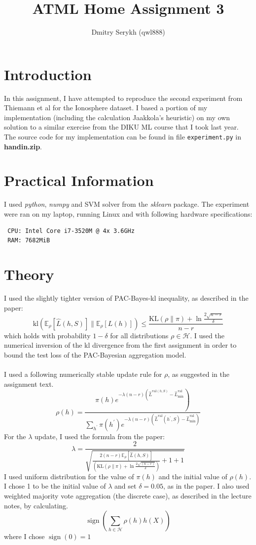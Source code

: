 \documentclass[a4paper]{article}
\title{\vspace{-5cm}ATML Home Assignment 3}
\author{Dmitry Serykh (qwl888)}
\begin{document}
\maketitle
\section{Introduction}
In this assignment, I have attempted to reproduce the second experiment from
Thiemann et al for the Ionosphere dataset. I based a portion of my implementation
(including the calculation Jaakkola's heuristic) on my own solution to a similar
exercise from the DIKU ML course that I took last year. The source code for my
implementation can be found in file \texttt{experiment.py} in
\textbf{handin.zip}.


\section{Practical Information}
I used \emph{python}, \emph{numpy} and SVM solver
from the \emph{sklearn} package. The experiment were ran on my laptop, running
Linux and with following hardware specifications:
\begin{verbatim}
 CPU: Intel Core i7-3520M @ 4x 3.6GHz
 RAM: 7682MiB
\end{verbatim}

\section{Theory}
I used the slightly tighter version of PAC-Bayes-kl inequality, as described in
the paper:
\[
\mathrm{kl}\left(\mathbb{E}_{\rho}[\hat{L}(h, S)] \|
\mathbb{E}_{\rho}[L(h)]\right) \leq \frac{\mathrm{KL}(\rho \| \pi)+\ln \frac{2
    \sqrt{n-r}}{\delta}}{n-r}
\]
which holds with probability $1 - \delta$ for all distributions $\rho \in
\mathcal{H}$. I used the numerical inversion of the kl divergence from the first
assignment in order to bound the test loss of the PAC-Bayesian aggregation model.\\\\
I used a following numerically stable
update rule for $\rho$, as suggested in the assignment text.
\[
\rho(h) = 
\frac{\left.\pi(h) e^{-\lambda(n-r)\left(\hat{L}^{\mathrm{val}(h, S)}-\hat{L}_{\mathrm{min}}^{\mathrm{val}}\right.}\right)}{\sum_{h^{\prime}} \pi\left(h^{\prime}\right) e^{-\lambda(n-r)\left(\hat{L}^{\mathrm{val}}\left(h^{\prime}, S\right)-\hat{L}_{\mathrm{min}}^{\mathrm{val}}\right)}}
\]
For the $\lambda$ update, I used the formula from the paper:
\[
\lambda=\frac{2}{\sqrt{\frac{2(n-r) \mathbb{E}_{\rho}[\hat{L}(h, S)]}{\left(\mathrm{KL}(\rho \| \pi)+\ln \frac{2 \sqrt{(n-r)}}{\delta}\right)}+1+1}}
\]
I used uniform distribution for the value of $\pi(h)$ and the initial value of
$\rho(h)$. I chose 1 to be the initial value of $\lambda$ and set $\delta =
0.05$, as in the paper. I also used weighted majority vote aggregation (the
discrete case), as described in the lecture notes, by calculating.
\[
\operatorname{sign}\left(\sum_{h \in \mathcal{H}} \rho(h) h(X)\right)
\]
where I chose $\operatorname{sign}(0)=1$\\\\
\end{document}
